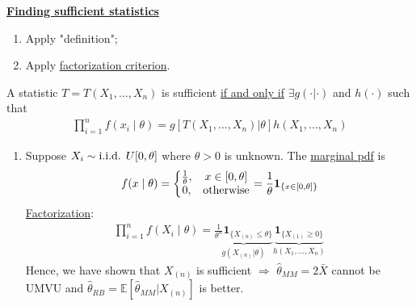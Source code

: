 \documentclass[11pt]{elegantbook}
\begin{document}
\textbf{\underline{Finding sufficient statistics}}
\begin{enumerate}[$\circ$]
    \item Apply "definition";
    \item Apply \underline{factorization criterion}.
\end{enumerate}

\begin{proposition}
    A statistic $T=T(X_1,...,X_n)$ is sufficient \underline{if and only if} $\exists g(\cdot|\cdot)$ and $h(\cdot)$ such that
    \begin{equation}
        \begin{aligned}
            \prod_{i=1}^n f(x_i\mid \theta)=g[T(X_1,...,X_n)| \theta] h(X_1,...,X_n)
        \end{aligned}
        \nonumber
    \end{equation}
\end{proposition}

\begin{example}\quad
    \begin{enumerate}
        \item Suppose $X_i\sim \textnormal{i.i.d. } U[0,\theta]$ where $\theta>0$ is unknown. The \underline{marginal pdf} is
        \begin{equation}
            \begin{aligned}
                f(x\mid \theta)=\left\{\begin{matrix}
                    \frac{1}{\theta},&x\in[0,\theta]\\
                    0,&\textnormal{otherwise}
                \end{matrix}\right.=\frac{1}{\theta}\mathbf{1}_{\{x\in[0,\theta]\}}
            \end{aligned}
            \nonumber
        \end{equation}
        \underline{Factorization}:
        \begin{equation}
            \begin{aligned}
                \prod_{i=1}^n f(X_i\mid \theta)=\underbrace{\frac{1}{\theta^n}\mathbf{1}_{\{X_{(n)}\leq \theta\}}}_{g(X_{(n)}|\theta)} \underbrace{\mathbf{1}_{\{X_{(1)}\geq 0\}}}_{h(X_1,...,X_n)}
            \end{aligned}
            \nonumber
        \end{equation}
        Hence, we have shown that $X_{(n)}$ is sufficient $\Rightarrow$ $\hat{\theta}_{MM}=2\bar{X}$ cannot be UMVU and $\hat{\theta}_{RB}=\mathbb{E}[\hat{\theta}_{MM}|X_{(n)}]$ is better.
    \end{enumerate}
\end{example}
\end{document}
